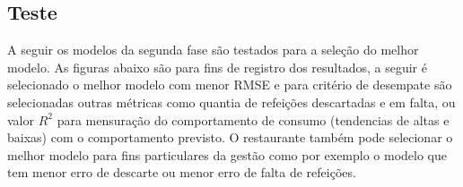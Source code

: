 \documentclass[	12pt, Times, openright, twoside, a4paper, english, brazil]{abntex2}
\begin{document}
	    \subsection{Teste}
	        A seguir os modelos da segunda fase são testados para a seleção do melhor modelo.
	        As figuras abaixo são para fins de registro dos resultados, a seguir é selecionado o melhor modelo com menor RMSE e para critério de desempate são selecionadas outras métricas como quantia de refeições descartadas e em falta, ou valor $R^2$ para mensuração do comportamento de consumo (tendencias de altas e baixas) com o comportamento previsto. O restaurante também pode selecionar o melhor modelo para fins particulares da gestão como por exemplo o modelo que tem menor erro de descarte ou menor erro de falta de refeições. 
    	    
\end{document}
